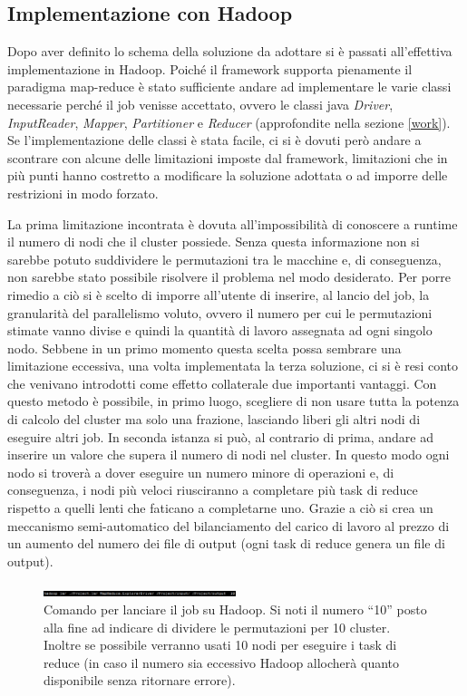 \documentclass[]{IEEEtran}
\begin{document}
\subsection{Implementazione con Hadoop}
Dopo aver definito lo schema della soluzione da adottare si è passati all'effettiva implementazione in Hadoop. Poiché il framework supporta pienamente il paradigma map-reduce è stato sufficiente andare ad implementare le varie classi necessarie perché il job venisse accettato, ovvero le classi java \emph{Driver}, \emph{InputReader}, \emph{Mapper}, \emph{Partitioner} e \emph{Reducer} (approfondite nella sezione \ref{work}). Se l'implementazione delle classi è stata facile, ci si è dovuti però andare a scontrare con alcune delle limitazioni imposte dal framework, limitazioni che in più punti hanno costretto a modificare la soluzione adottata o ad imporre delle restrizioni in modo forzato.

La prima limitazione incontrata è dovuta all'impossibilità di conoscere a runtime il numero di nodi che il cluster possiede. Senza questa informazione non si sarebbe potuto suddividere le permutazioni tra le macchine e, di conseguenza, non sarebbe stato possibile risolvere il problema nel modo desiderato. Per porre rimedio a ciò si è scelto di imporre all'utente di inserire, al lancio del job, la granularità del parallelismo voluto, ovvero il numero per cui le permutazioni stimate vanno divise e quindi la quantità di lavoro assegnata ad ogni singolo nodo. Sebbene in un primo momento questa scelta possa sembrare una limitazione eccessiva, una volta implementata la terza soluzione, ci si è resi conto che venivano introdotti come effetto collaterale due importanti vantaggi. Con questo metodo è possibile, in primo luogo, scegliere di non usare tutta la potenza di calcolo del cluster ma solo una frazione, lasciando liberi gli altri nodi di eseguire altri job. In seconda istanza si può, al contrario di prima, andare ad inserire un valore che supera il numero di nodi nel cluster. In questo modo ogni nodo si troverà a dover eseguire un numero minore di operazioni e, di conseguenza, i nodi più veloci riusciranno a completare più task di reduce rispetto a quelli lenti che faticano a completarne uno. Grazie a ciò si crea un meccanismo semi-automatico del bilanciamento del carico di lavoro al prezzo di un aumento del numero dei file di output (ogni task di reduce genera un file di output).
\begin{figure}
	\centering
	\includegraphics[width=0.5\textwidth]{images/exec.png}
	\caption{Comando per lanciare il job su Hadoop. Si noti il numero ``10'' posto alla fine ad indicare di dividere le permutazioni per 10 cluster. Inoltre se possibile verranno usati 10 nodi per eseguire i task di reduce (in caso il numero sia eccessivo Hadoop allocherà quanto disponibile senza ritornare errore).}
\end{figure}
\end{document}
